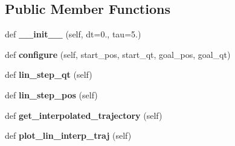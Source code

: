 \subsection*{Public Member Functions}
\begin{DoxyCompactItemize}
\item 
\hypertarget{classaml__ctrl_1_1utilities_1_1lin__interp_1_1_lin_interp_a510909b7cd1fd0fec18444d9ddf93914}{}\label{classaml__ctrl_1_1utilities_1_1lin__interp_1_1_lin_interp_a510909b7cd1fd0fec18444d9ddf93914} 
def {\bfseries \+\_\+\+\_\+init\+\_\+\+\_\+} (self, dt=0., tau=5.)
\item 
\hypertarget{classaml__ctrl_1_1utilities_1_1lin__interp_1_1_lin_interp_af86d0e3b306434f7443c9f182b68bb7b}{}\label{classaml__ctrl_1_1utilities_1_1lin__interp_1_1_lin_interp_af86d0e3b306434f7443c9f182b68bb7b} 
def {\bfseries configure} (self, start\+\_\+pos, start\+\_\+qt, goal\+\_\+pos, goal\+\_\+qt)
\item 
\hypertarget{classaml__ctrl_1_1utilities_1_1lin__interp_1_1_lin_interp_a00fedfe619ef49db994f26bc3d9362a4}{}\label{classaml__ctrl_1_1utilities_1_1lin__interp_1_1_lin_interp_a00fedfe619ef49db994f26bc3d9362a4} 
def {\bfseries lin\+\_\+step\+\_\+qt} (self)
\item 
\hypertarget{classaml__ctrl_1_1utilities_1_1lin__interp_1_1_lin_interp_aff59e4d958081c8cf7a38c02f03e17f2}{}\label{classaml__ctrl_1_1utilities_1_1lin__interp_1_1_lin_interp_aff59e4d958081c8cf7a38c02f03e17f2} 
def {\bfseries lin\+\_\+step\+\_\+pos} (self)
\item 
\hypertarget{classaml__ctrl_1_1utilities_1_1lin__interp_1_1_lin_interp_ad25640ebae29b62c083c959adc7eb362}{}\label{classaml__ctrl_1_1utilities_1_1lin__interp_1_1_lin_interp_ad25640ebae29b62c083c959adc7eb362} 
def {\bfseries get\+\_\+interpolated\+\_\+trajectory} (self)
\item 
\hypertarget{classaml__ctrl_1_1utilities_1_1lin__interp_1_1_lin_interp_a481f09879b468a539c44b5ba1122b4f1}{}\label{classaml__ctrl_1_1utilities_1_1lin__interp_1_1_lin_interp_a481f09879b468a539c44b5ba1122b4f1} 
def {\bfseries plot\+\_\+lin\+\_\+interp\+\_\+traj} (self)
\end{DoxyCompactItemize}
